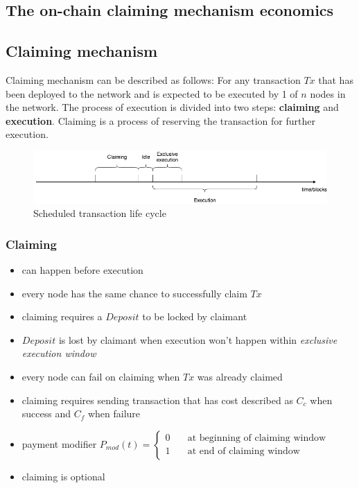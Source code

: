 \documentclass{report}
\begin{document}
  \begin{appendices}
    \chapter{The on-chain claiming mechanism economics}\label{appendix}
    \section{Claiming mechanism}
  Claiming mechanism can be described as follows:
  For any transaction $Tx$ that has been deployed to the network and is expected to be executed by 1 of $n$ nodes in the network. The process of execution is divided into two steps:
  \textbf{claiming} and \textbf{execution}. Claiming is a process of reserving the transaction for further execution.
  \begin{figure}
    \includegraphics[width=\linewidth]{claiming/timeranges.png}
    \caption{Scheduled transaction life cycle}
    \label{fig:boat1}
  \end{figure}

  \subsection{Claiming}
  \begin{itemize}
  \item can happen before execution
  \item every node has the same chance to successfully claim $Tx$
  \item claiming requires a $Deposit$ to be locked by claimant
  \item $Deposit$ is lost by claimant when execution won't happen within \textit{exclusive execution window}
  \item every node can fail on claiming when $Tx$ was already claimed
  \item claiming requires sending transaction that has cost described as $C_{c}$ when success and $C_{f}$ when failure
  \item payment modifier $P_{mod}(t)=\begin{cases}
  0 & \quad \text{at beginning of claiming window}\\
  1 & \quad \text{at end of claiming window}
  \end{cases}$
  \item claiming is optional
  \end{itemize}


\end{appendices}
\end{document}
